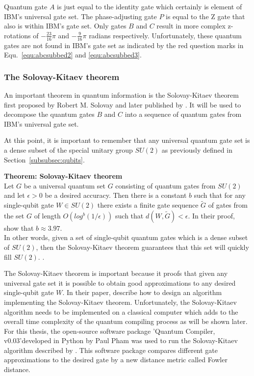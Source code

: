 Quantum gate $A$ is just equal to the identity gate which certainly is element of IBM's universal gate set. The phase-adjusting gate $P$ is equal to the Z gate that also is within IBM's gate set. Only gates $B$ and $C$ result in more complex z-rotations of $-\frac{23}{16}\pi$ and $-\frac{9}{16}\pi$ radians respectively. Unfortunately, these quantum gates are not found in IBM's gate set as indicated by the red question marks in Equ.~\ref{equ:abcsubbed2} and \ref{equ:abcsubbed3}.

\subsubsection{The Solovay-Kitaev theorem}
\label{subsubsubsec:solovaykitaev}

An important theorem in quantum information is the Solovay-Kitaev theorem first proposed by Robert M. Solovay and later published by . It will be used to decompose the quantum gates $B$ and $C$ into a sequence of quantum gates from IBM's universal gate set.

At this point, it is important to remember that any universal quantum gate set is a dense subset of the special unitary group $SU(2)$ as previously defined in Section~\ref{subsubsec:qubits}.

\begin{redbox}
\textbf{Theorem: Solovay-Kitaev theorem}\\
\newline
Let $G$ be a universal quantum set $G$ consisting of quantum gates from $SU(2)$ and let $\epsilon > 0$ be a desired accuracy. Then there is a constant $b$ such that for any single-qubit gate $W \in SU(2)$ there exists a
finite gate sequence $\tilde{G}$ of gates from the set $G$ of length $O(log^b (1/\epsilon))$ such that $d(W, \tilde{G}) < \epsilon$. In their proof,  show that $b \approx 3.97$.\\
\newline
In other words, given a set of single-qubit quantum gates which is a dense subset of $SU(2)$, then the Solovay-Kitaev theorem guarantees that this set will quickly fill $SU(2)$.
\cite{dawson2005solovay}.
\end{redbox}

The Solovay-Kitaev theorem is important because it proofs that given any universal gate set it is possible to obtain good approximations to any desired single-qubit gate $W$. In their paper,  describe how to design an algorithm implementing the Solovay-Kitaev theorem. Unfortunately, the Solovay-Kitaev algorithm needs to be implemented on a classical computer which adds to the overall time complexity of the quantum compiling process as will be shown later. For this thesis, the open-source software package 'Quantum Compiler, v0.03'\footnotemark[15] developed in Python by Paul Pham was used to run the Solovay-Kitaev algorithm described by . This software package compares different gate approximations to the desired gate by a new distance metric called Fowler distance.

